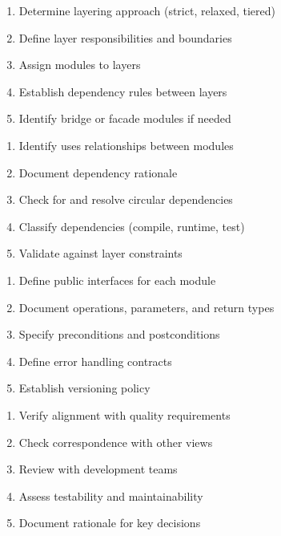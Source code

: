 \documentclass[11pt,letterpaper]{article}
\begin{document}
\begin{guidancebox}
\begin{enumerate}[nosep]
    \item Determine layering approach (strict, relaxed, tiered)
    \item Define layer responsibilities and boundaries
    \item Assign modules to layers
    \item Establish dependency rules between layers
    \item Identify bridge or facade modules if needed
\end{enumerate}
\end{guidancebox}

\begin{guidancebox}
\begin{enumerate}[nosep]
    \item Identify uses relationships between modules
    \item Document dependency rationale
    \item Check for and resolve circular dependencies
    \item Classify dependencies (compile, runtime, test)
    \item Validate against layer constraints
\end{enumerate}
\end{guidancebox}

\begin{guidancebox}
\begin{enumerate}[nosep]
    \item Define public interfaces for each module
    \item Document operations, parameters, and return types
    \item Specify preconditions and postconditions
    \item Define error handling contracts
    \item Establish versioning policy
\end{enumerate}
\end{guidancebox}

\begin{guidancebox}
\begin{enumerate}[nosep]
    \item Verify alignment with quality requirements
    \item Check correspondence with other views
    \item Review with development teams
    \item Assess testability and maintainability
    \item Document rationale for key decisions
\end{enumerate}
\end{guidancebox}
\end{document}
